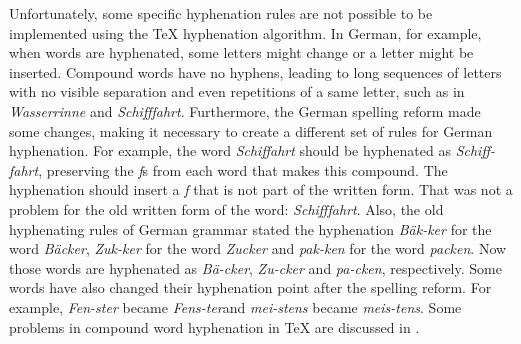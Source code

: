 \documentclass{article}
\begin{document}
Unfortunately, some specific hyphenation rules are not possible to be
implemented using the \TeX{} hyphenation algorithm. In German, for example,
when words are hyphenated, some letters might change or a letter might be
inserted.  Compound words have no hyphens, leading to long sequences of letters
with no visible separation and even repetitions of a same letter, such as in
\emph{Wasserrinne} and \emph{Schifffahrt}. Furthermore, the German spelling
reform made some changes, making it necessary to create a different set of
rules for German hyphenation.  For example, the word \emph{Schiffahrt} should
be hyphenated as \emph{Schiff-fahrt}, preserving the \emph{f}s from each word
that makes this compound. The hyphenation should insert a \emph{f} that is not
part of the written form. That was not a problem for the old written form of
the word: \emph{Schifffahrt}. Also, the old hyphenating rules of German grammar
stated the hyphenation \emph{Bäk-ker} for the word \emph{Bäcker},
\emph{Zuk-ker} for the word \emph{Zucker} and \emph{pak-ken} for the word
\emph{packen}. Now those words are hyphenated as \emph{Bä-cker}, \emph{Zu-cker}
and \emph{pa-cken}, respectively. Some words have also changed their
hyphenation point after the spelling reform. For example, \emph{Fen-ster}
became \emph{Fens-ter}and \emph{mei-stens} became \emph{meis-tens}. Some
problems in compound word hyphenation in \TeX{} are discussed in
\cite{sojka1995a}.







\end{document}
